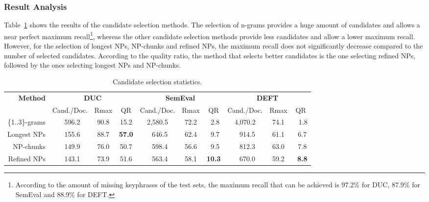     \subsubsection{Result Analysis}
    \label{subsubsec:candidate_extraction_result_analysis}
      Table~\ref{tab:candidate_extraction_statistics} shows the results of the
      candidate selection methods. The selection of n-grams provides a huge
      amount of candidates and allows a near perfect maximum
      recall\footnote{According to the amount of missing keyphrases of the test
      sets, the maximum recall that can be achieved is 97.2\% for DUC, 87.9\%
      for SemEval and 88.9\% for DEFT.}, whereas the other candidate selection
      methods provide less candidates and allow a lower maximum recall. However,
      for the selection of longest NPs, NP-chunks and refined NPs, the maximum
      recall does not significantly decrease compared to the number of selected
      candidates. According to the quality ratio, the method that selects
      better candidates is the one selecting refined NPs, followed by the ones
      selecting longest NPs and NP-chunks.
      \begin{table}
        \centering
        \begin{tabular}{r@{~~}c@{~~}c@{~~}c@{~~}c@{~~}c@{~~}c@{~~}c@{~~}c@{~~}c}
          \toprule
          \multirow{2}{*}[-2pt]{\textbf{Method}} & \multicolumn{3}{c}{\textbf{DUC}} & \multicolumn{3}{c}{\textbf{SemEval}} & \multicolumn{3}{c}{\textbf{DEFT}}\\
          \cmidrule(r){2-4}\cmidrule(r){5-7}\cmidrule{8-10}
          & Cand./Doc. & Rmax & QR & Cand./Doc. & Rmax & QR & Cand./Doc. & Rmax & QR\\
          \midrule
          \{1..3\}-grams & $~~~$596.2 & 90.8 & 15.2 & 2,580.5 & 72.2 & $~~$2.8 & 4,070.2 & 74.1 & $~~~$1.8\\
          Longest NPs & $~~~$155.6 & 88.7 & \textbf{57.0} & $~~~$646.5 & 62.4 & $~~$9.7 & $~~~$914.5 & 61.1 & $~~$6.7\\
          NP-chunks & $~~~$149.9 & 76.0 & 50.7 & $~~~$598.4 & 56.6 & $~~$9.5 & $~~~$812.3 & 63.0 & $~~$7.8\\
          Refined NPs & $~~~$143.1 & 73.9 & 51.6 & $~~~$563.4 & 58.1 & \textbf{10.3} & $~~~$670.0 & 59.2 & \textbf{$~~$8.8}\\
          \bottomrule
        \end{tabular}
        \caption{Candidate selection statistics.
                 \label{tab:candidate_extraction_statistics}}
      \end{table}

